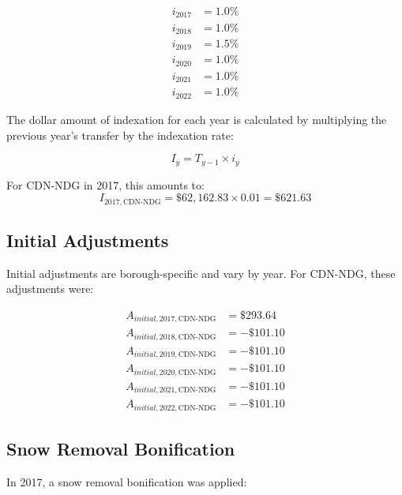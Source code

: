 \documentclass{article}
\begin{document}
\begin{equation}
\begin{aligned}
i_{2017} &= 1.0\% \\
i_{2018} &= 1.0\% \\
i_{2019} &= 1.5\% \\
i_{2020} &= 1.0\% \\
i_{2021} &= 1.0\% \\
i_{2022} &= 1.0\%
\end{aligned}
\end{equation}

The dollar amount of indexation for each year is calculated by multiplying the previous year's transfer by the indexation rate:

\begin{equation}
I_y = T_{y-1} \times i_y
\end{equation}

For CDN-NDG in 2017, this amounts to:
\begin{equation}
I_{2017,\text{CDN-NDG}} = \$62,162.83 \times 0.01 = \$621.63
\end{equation}

\subsection{Initial Adjustments}

Initial adjustments are borough-specific and vary by year. For CDN-NDG, these adjustments were:

\begin{equation}
\begin{aligned}
A_{initial,2017,\text{CDN-NDG}} &= \$293.64 \\
A_{initial,2018,\text{CDN-NDG}} &= -\$101.10 \\
A_{initial,2019,\text{CDN-NDG}} &= -\$101.10 \\
A_{initial,2020,\text{CDN-NDG}} &= -\$101.10 \\
A_{initial,2021,\text{CDN-NDG}} &= -\$101.10 \\
A_{initial,2022,\text{CDN-NDG}} &= -\$101.10
\end{aligned}
\end{equation}

\subsection{Snow Removal Bonification}

In 2017, a snow removal bonification was applied:
\end{document}
